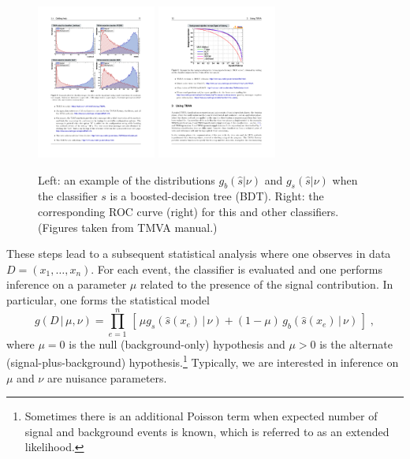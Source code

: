 \documentclass[11pt, oneside]{article}   	%
\begin{document}
\begin{figure}[htbp]
\begin{center}
 \includegraphics[height=2in]{example-TMVA-BDT.pdf}
 \includegraphics[height=2in]{example-TMVA-ROC.pdf}
\caption{Left: an example of the distributions $g_b(\hat s|\nu)$ and $g_s(\hat s|\nu)$ when the classifier $s$ is a boosted-decision tree (BDT). Right: the corresponding ROC curve (right) for this and other classifiers. (Figures taken from TMVA manual.)}
\label{fig:tmva}
\end{center}
\end{figure}

These steps lead to a subsequent statistical analysis where one observes in data \\
${D=(x_1, \dots, x_n)}$. For each event, the classifier is evaluated and one performs inference on a parameter $\mu$ related to the presence of the signal contribution. In particular, one forms the statistical model
\begin{equation}\label{eq:typicalML}
g( D \,|\, \mu, \nu) = \prod_{e=1}^n \, \left[\, \mu g_s( \hat s(x_e) \, |\,  \nu)  + (1-\mu)\, g_b( \hat s(x_e) \,|\, \nu) \,\right] \; ,
\end{equation}
where $\mu=0$ is the null (background-only) hypothesis and $\mu>0$ is the alternate (signal-plus-background) hypothesis.\footnote{Sometimes there is an additional Poisson term when expected number of signal and background events is known, which is referred to as an extended likelihood.} Typically, we are interested in inference on $\mu$ and $\nu$ are nuisance parameters.
\end{document}
